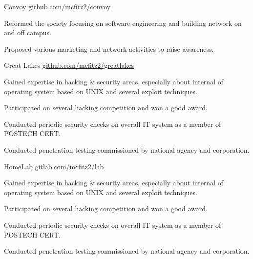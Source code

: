 

\begin{cventries}

  \cventry
    {} %
    {Convoy} %
    {\href{https://github.com/mcfitz2/convoy}{github.com/mcfitz2/convoy}} %
    {} %
    {
      \begin{cvitems} %
        \item {Reformed the society focusing on software engineering and building network on and off campus.}
        \item {Proposed various marketing and network activities to raise awareness.}
      \end{cvitems}
    }

  \cventry
    {} %
    {Great Lakes} %
    {\href{https://github.com/mcfitz2/greatlakes}{github.com/mcfitz2/greatlakes}} %
    {} %
    {
      \begin{cvitems} %
        \item {Gained expertise in hacking \& security areas, especially about internal of operating system based on UNIX and several exploit techniques.}
        \item {Participated on several hacking competition and won a good award.}
        \item {Conducted periodic security checks on overall IT system as a member of POSTECH CERT.}
        \item {Conducted penetration testing commissioned by national agency and corporation.}
      \end{cvitems}
    }
  \cventry
    {} %
    {HomeLab} %
    {\href{https://gitlab.com/mcfitz2/lab}{gitlab.com/mcfitz2/lab}} %
    {} %
    {
      \begin{cvitems} %
        \item {Gained expertise in hacking \& security areas, especially about internal of operating system based on UNIX and several exploit techniques.}
        \item {Participated on several hacking competition and won a good award.}
        \item {Conducted periodic security checks on overall IT system as a member of POSTECH CERT.}
        \item {Conducted penetration testing commissioned by national agency and corporation.}
      \end{cvitems}
    }

\end{cventries}
